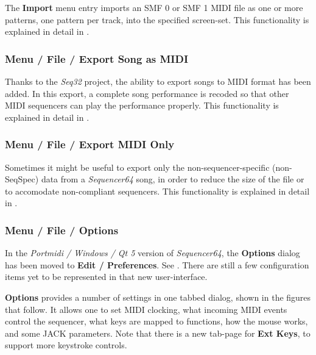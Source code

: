    The \textbf{Import} menu entry imports an SMF 0
   or SMF 1 MIDI file as one or more patterns, one pattern per track,
   into the specified screen-set.
   This functionality is explained in detail in
   .

\subsubsection{Menu / File / Export Song as MIDI}
\label{subsubsec:seq64_menu_file_export}

   Thanks to the \textsl{Seq32} project, the ability to export songs to MIDI
   format has been added.  In this export, a complete song performance is
   recoded so that other MIDI sequencers can play the performance properly.
   This functionality is explained in detail in
   .

\subsubsection{Menu / File / Export MIDI Only}
\label{subsubsec:seq64_menu_file_export_midi_only}

   Sometimes it might be useful to export only the non-sequencer-specific
   (non-SeqSpec) data from a \textsl{Sequencer64} song, in order to reduce the
   size of the file or to accomodate non-compliant sequencers.
   This functionality is explained in detail in
   .

\subsubsection{Menu / File / Options}
\label{subsubsec:seq64_menu_file_options}

   In the \textsl{Portmidi / Windows / Qt 5} version of
   \textsl{Sequencer64}, the \textbf{Options} dialog has been moved to 
   \textbf{Edit / Preferences}.
   See .
   There are still a few configuration items yet to be represented in that
   new user-interface.

   \textbf{Options} provides a number of settings in one
   tabbed dialog, shown in the figures that follow.
   It allows one to set MIDI clocking,
   what incoming MIDI events control the sequencer, what keys are
   mapped to functions, how the mouse works, and some JACK parameters.
   Note that there is a new tab-page for \textbf{Ext Keys}, to support
   more keystroke controls.

